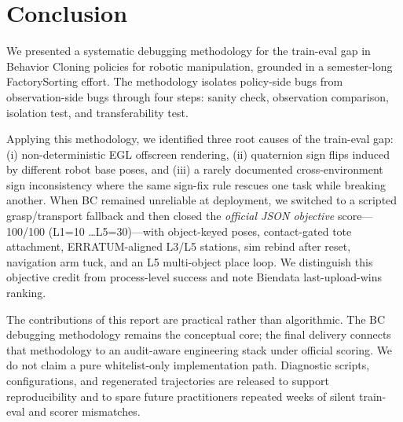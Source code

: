 \section{Conclusion}
\label{sec:conclusion}

We presented a systematic debugging methodology for the train-eval gap in Behavior Cloning policies for robotic manipulation, grounded in a semester-long FactorySorting effort. The methodology isolates policy-side bugs from observation-side bugs through four steps: sanity check, observation comparison, isolation test, and transferability test.

Applying this methodology, we identified three root causes of the train-eval gap: (i) non-deterministic EGL offscreen rendering, (ii) quaternion sign flips induced by different robot base poses, and (iii) a rarely documented cross-environment sign inconsistency where the same sign-fix rule rescues one task while breaking another. When BC remained unreliable at deployment, we switched to a scripted grasp/transport fallback and then closed the \emph{official JSON objective} score---100/100 (L1{=}10 \ldots L5{=}30)---with object-keyed poses, contact-gated tote attachment, ERRATUM-aligned L3/L5 stations, sim rebind after reset, navigation arm tuck, and an L5 multi-object place loop. We distinguish this objective credit from process-level success and note Biendata last-upload-wins ranking.

The contributions of this report are practical rather than algorithmic. The BC debugging methodology remains the conceptual core; the final delivery connects that methodology to an audit-aware engineering stack under official scoring. We do not claim a pure whitelist-only implementation path. Diagnostic scripts, configurations, and regenerated trajectories are released to support reproducibility and to spare future practitioners repeated weeks of silent train-eval and scorer mismatches.
